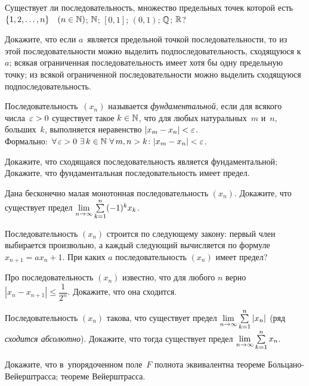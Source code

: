 \documentclass[a4paper,12pt]{article}
\begin{document}
Существует ли последовательность, множество предельных точек которой есть\\
$\{1,2,\ldots,n\} \quad (n\in\mathbb{N})$;
$\mathbb{N}$;
$[0,1]$;
$(0,1)$;
$\mathbb{Q}$;
$\mathbb{R}$?

Докажите, что
если $a$~является предельной точкой последовательности, то из этой последовательности можно выделить подпоследовательность, сходящуюся к~$a$; 
всякая ограниченная последовательность имеет хотя бы одну предельную точку;
из всякой ограниченной последовательности можно выделить сходящуюся подпоследовательность.

Последовательность~$(x_n)$ называется \emph{фундаментальной}, если для всякого числа~$\varepsilon>0$ существует такое $k\in\mathbb{N}$, что для любых натуральных~$m$ и~$n$, больших~$k$, выполняется неравенство $|x_m - x_n|<\varepsilon$.\\
Формально: $\,\forall\,\varepsilon>0\,\,\exists\, k\in\mathbb{N}\,\,\forall\, m,n>k \colon |x_m-x_n|<\varepsilon$.

 Докажите, что сходящаяся последовательность является фундаментальной;
 Докажите, что фундаментальная последовательность имеет предел.

Дана бесконечно малая монотонная последовательность $(x_n)$. Докажите, что существует предел $\lim\limits_{n \rightarrow \infty} \sum\limits_{k=1}^{n}(-1)^k x_k$.

Последовательность $(x_n)$ строится по следующему закону: первый член выбирается произвольно, а каждый следующий вычисляется по формуле $x_{n+1}=ax_n+1$. При каких $a$ последовательность $(x_n)$ имеет предел?

Про последовательность $(x_n)$ известно, что для любого $n$ верно $|x_n - x_{n+1}|\le\dfrac{1}{2^n}$. Докажите, что она сходится.

Последовательность $(x_n)$ такова, что существует предел $\lim\limits_{n \rightarrow \infty}\sum\limits_{k=1}^{n} |x_n|$ (ряд \emph{сходится абсолютно}). Докажите, что тогда существует предел $\lim\limits_{n \rightarrow \infty}\sum\limits_{k=1}^{n} x_n$.

Докажите, что в~упорядоченном поле~$F$ полнота эквивалентна
 теореме Больцано-Вейерштрасса;
 теореме Вейерштрасса.

\vfill
{}
\GenXMLW
\end{document}
